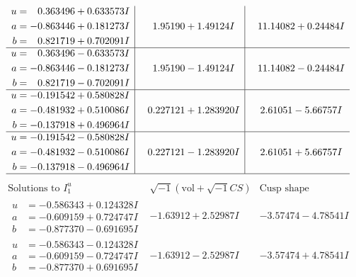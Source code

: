 \documentclass[1p]{elsarticle_modified}
\theoremstyle{definition}
\newcommand{\I}{\sqrt{-1}}
\begin{document}
$$\begin{array}{c|c|c}
\begin{aligned}
u &= \phantom{-}0.363496 + 0.633573 I \\
a &= -0.863446 + 0.181273 I \\
b &= \phantom{-}0.821719 + 0.702091 I\end{aligned}
 & \phantom{-}1.95190 + 1.49124 I & \phantom{-}11.14082 + 0.24484 I \\ \hline\begin{aligned}
u &= \phantom{-}0.363496 - 0.633573 I \\
a &= -0.863446 - 0.181273 I \\
b &= \phantom{-}0.821719 - 0.702091 I\end{aligned}
 & \phantom{-}1.95190 - 1.49124 I & \phantom{-}11.14082 - 0.24484 I \\ \hline\begin{aligned}
u &= -0.191542 + 0.580828 I \\
a &= -0.481932 + 0.510086 I \\
b &= -0.137918 + 0.496964 I\end{aligned}
 & \phantom{-}0.227121 + 1.283920 I & \phantom{-}2.61051 - 5.66757 I \\ \hline\begin{aligned}
u &= -0.191542 - 0.580828 I \\
a &= -0.481932 - 0.510086 I \\
b &= -0.137918 - 0.496964 I\end{aligned}
 & \phantom{-}0.227121 - 1.283920 I & \phantom{-}2.61051 + 5.66757 I\\
 \hline 
 \end{array}$$\newpage$$\begin{array}{c|c|c}  
\text{Solutions to }I^u_{1}& \I (\text{vol} + \sqrt{-1}CS) & \text{Cusp shape}\\
 \hline 
\begin{aligned}
u &= -0.586343 + 0.124328 I \\
a &= -0.609159 + 0.724747 I \\
b &= -0.877370 - 0.691695 I\end{aligned}
 & -1.63912 + 2.52987 I & -3.57474 - 4.78541 I \\ \hline\begin{aligned}
u &= -0.586343 - 0.124328 I \\
a &= -0.609159 - 0.724747 I \\
b &= -0.877370 + 0.691695 I\end{aligned}
 & -1.63912 - 2.52987 I & -3.57474 + 4.78541 I \\ \hline\begin{aligned}

\end{aligned}
\end{array}$$
\end{document}

